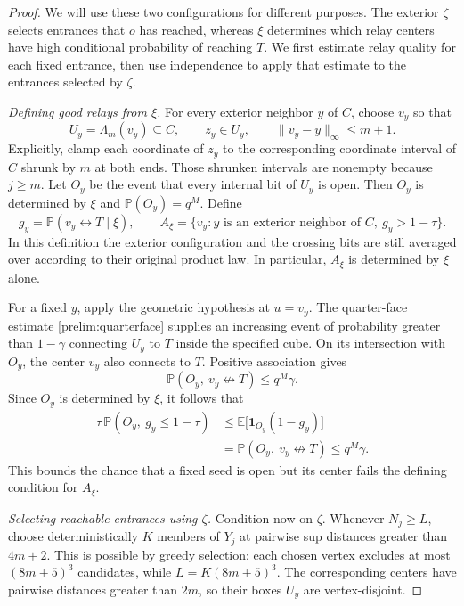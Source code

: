 \documentclass[11pt]{article}
\theoremstyle{definition}
\theoremstyle{remark}
\numberwithin{equation}{section}
\begin{document}
\begin{proof}
We will use these two configurations for different purposes.
The exterior $\zeta$ selects entrances that $o$ has reached, whereas
$\xi$ determines which relay centers have high conditional probability
of reaching $T$. We first estimate relay quality for each fixed entrance,
then use independence to apply that estimate to the entrances selected
by $\zeta$.

\emph{Defining good relays from $\xi$.}
For every exterior neighbor $y$ of $C$, choose $v_y$ so that
\[
 U_y=\Lambda_m(v_y)\subseteq C,
 \qquad z_y\in U_y,
 \qquad \|v_y-y\|_\infty\le m+1.
\]
Explicitly, clamp each coordinate of $z_y$ to the corresponding
coordinate interval of $C$ shrunk by $m$ at both ends. Those shrunken
intervals are nonempty because $j\ge m$.
Let $O_y$ be the event that every internal bit of $U_y$ is open.
Then $O_y$ is determined by $\xi$ and $\mathbb P(O_y)=q^M$.
Define
\[
 g_y=\mathbb P(v_y\leftrightarrow T\mid\xi),
 \qquad
 A_\xi=\{v_y:y\text{ is an exterior neighbor of }C,
                         \ g_y>1-\tau\}.
\]
In this definition the exterior configuration and the crossing bits
are still averaged over according to their original product law.
In particular, $A_\xi$ is determined by $\xi$ alone.

For a fixed $y$, apply the geometric hypothesis at $u=v_y$.
The quarter-face estimate \eqref{prelim:quarterface} supplies an
increasing event of probability greater than $1-\gamma$ connecting
$U_y$ to $T$ inside the specified cube. On its intersection with $O_y$,
the center $v_y$ also connects to $T$. Positive association gives
\[
 \mathbb P(O_y,\ v_y\not\leftrightarrow T)\le q^M\gamma.
\]
Since $O_y$ is determined by $\xi$, it follows that
\begin{equation}
 \begin{split}
 \tau\,\mathbb P(O_y,\ g_y\le1-\tau)
 &\le \mathbb E\big[\mathbf 1_{O_y}(1-g_y)\big]\\
 &=\mathbb P(O_y,\ v_y\not\leftrightarrow T)
 \le q^M\gamma.
 \end{split}
 \label{ext:relay-quality}
\end{equation}
This bounds the chance that a fixed seed is open but its center fails
the defining condition for $A_\xi$.

\emph{Selecting reachable entrances using $\zeta$.}
Condition now on $\zeta$. Whenever $N_j\ge L$, choose deterministically
$K$ members of $Y_j$ at pairwise sup distances greater than $4m+2$.
This is possible by greedy selection: each chosen vertex excludes at
most $(8m+5)^3$ candidates, while $L=K(8m+5)^3$.
The corresponding centers have pairwise distances greater than $2m$,
so their boxes $U_y$ are vertex-disjoint.


\end{proof}
\end{document}
